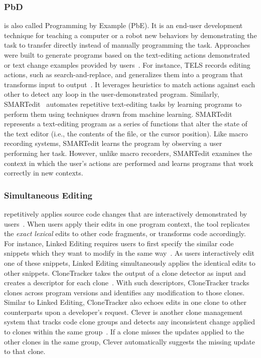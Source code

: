 \documentclass[runningheads,a4paper]{llncs}
\begin{document}
\subsubsection{PbD} is also called Programming by Example (PbE). It is an end-user development technique for teaching a computer or a robot new behaviors by demonstrating the task to transfer directly instead of manually programming the task.
Approaches were built to generate programs based on the text-editing actions demonstrated or text change examples provided by users~\cite{Nix1984,WiM1993,LaH1995,LWD2001}. For instance, 
TELS records editing actions, such as search-and-replace, and generalizes them into a program that transforms input to output~\cite{WiM1993}. It leverages heuristics to match actions against each other to detect any loop in the user-demonstrated program. 
Similarly, SMARTedit~\cite{LWD2001} automates repetitive text-editing tasks by learning programs to perform them using techniques drawn from machine learning. SMARTedit represents a text-editing program as a series of functions that alter the state of the text editor (i.e., the contents of the file, or the cursor position). Like macro recording systems, SMARTedit learns the program by observing a user performing her task. However, unlike macro recorders, SMARTedit examines the context in which the user's actions are performed and learns programs that work correctly in new contexts. 

\subsubsection{Simultaneous Editing} repetitively applies source code changes that are interactively demonstrated by users~\cite{MiM2001}. When users apply their edits in one program context, the tool replicates the \emph{exact lexical} edits to other code fragments, or transforms code accordingly. For instance, Linked Editing requires users to first specify the similar code snippets which they want to modify in the same way~\cite{TBG2004}. As users interactively edit one of these snippets, Linked Editing simultaneously applies the identical edits to other snippets. 
CloneTracker takes the output of a clone detector as input and creates a descriptor for each clone~\cite{DuR2007}. With such descriptors, CloneTracker tracks clones across program versions and identifies any modification to those clones. 
Similar to Linked Editing, CloneTracker also echoes edits in one clone to other counterparts upon a developer's request. 
Clever is another clone management system that tracks code clone groups and detects any inconsistent change applied to clones within the same group~\cite{NNP2009}. If a clone misses the updates applied to the other clones in the same group, Clever automatically suggests the missing update to that clone.
\end{document}
